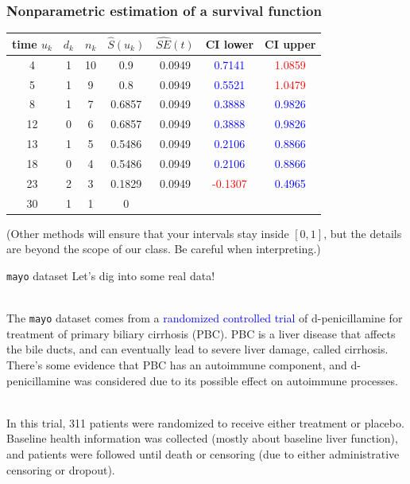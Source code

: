 \documentclass[10pt,t]{beamer}
\begin{document}
\begin{frame}
\frametitle{Nonparametric estimation of a survival function}
\begin{tabular}{|c|c|c|c|c|c|c|}
\hline
time $u_k$ & $d_k$ & $n_k$ & $\widehat{S}(u_k)$ & $\widehat{SE}(t)$ & CI lower & CI upper \\
\hline
4 & 1 & 10 & 0.9 & 0.0949 & \textcolor{blue}{0.7141} & \textcolor{red}{1.0859} \\
5 & 1 & 9 &  0.8 & 0.0949 & \textcolor{blue}{0.5521} & \textcolor{red}{1.0479}\\
8 & 1 & 7 & 0.6857 & 0.0949 & \textcolor{blue}{0.3888} & \textcolor{blue}{0.9826}\\
12 & 0 & 6 & 0.6857 & 0.0949 & \textcolor{blue}{0.3888} & \textcolor{blue}{0.9826}\\
13 & 1 & 5 & 0.5486 & 0.0949 & \textcolor{blue}{0.2106} & \textcolor{blue}{0.8866}\\
18 & 0 & 4 & 0.5486 & 0.0949 & \textcolor{blue}{0.2106} & \textcolor{blue}{0.8866}\\
23 & 2 & 3 & 0.1829 & 0.0949 & \textcolor{red}{-0.1307} & \textcolor{blue}{0.4965}\\
30 & 1 & 1 & 0 & & & \\
\hline
\end{tabular}

\vspace{0.5cm}
(Other methods will ensure that your intervals stay inside $[0,1]$, but the details are beyond the scope of our class. Be careful when interpreting.)
\end{frame}

\begin{frame}{\texttt{mayo} dataset}
	Let's dig into some real data!
	\\ ~\ 
	
	The \texttt{mayo} dataset comes from a \textcolor{blue}{randomized controlled trial} of d-penicillamine for treatment of primary biliary cirrhosis (PBC). PBC is a liver disease that affects the bile ducts, and can eventually lead to severe liver damage, called cirrhosis. There's some evidence that PBC has an autoimmune component, and d-penicillamine was considered due to its possible effect on autoimmune processes. 
	\\ ~\ 
	
	In this trial, 311 patients were randomized to receive either treatment or placebo. Baseline health information was collected (mostly about baseline liver function), and patients were followed until death or censoring (due to either administrative censoring or dropout). 
\end{frame}
\end{document}
